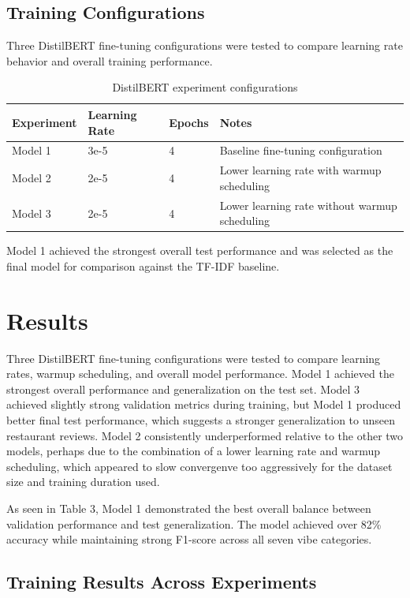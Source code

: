 \documentclass[11pt]{article}
\begin{document}
\subsection{Training Configurations}

Three DistilBERT fine-tuning configurations were tested to compare learning rate behavior and overall training performance.

\begin{table}[h]
\centering
\begin{tabular}{llll}
\toprule
Experiment & Learning Rate & Epochs & Notes \\
\midrule
Model 1 & 3e-5 & 4 & Baseline fine-tuning configuration \\
Model 2 & 2e-5 & 4 & Lower learning rate with warmup scheduling \\
Model 3 & 2e-5 & 4 & Lower learning rate without warmup scheduling \\
\bottomrule
\end{tabular}
\caption{DistilBERT experiment configurations}
\end{table}

Model 1 achieved the strongest overall test performance and was selected as the final model for comparison against the TF-IDF baseline.


\section{Results}

Three DistilBERT fine-tuning configurations were tested to compare learning rates, warmup scheduling, and overall model performance. 
Model 1 achieved the strongest overall performance and generalization on the test set. Model 3 achieved slightly strong validation metrics 
during training, but Model 1 produced better final test performance, which suggests a stronger generalization to unseen restaurant reviews. 
Model 2 consistently underperformed relative to the other two models, perhaps due to the combination of a lower learning rate and warmup 
scheduling, which appeared to slow convergenve too aggressively for the dataset size and training duration used. 

\medbreak \noindent As seen in Table 3, Model 1 demonstrated the best overall balance between validation performance and test generalization. The model achieved 
over 82\% accuracy while maintaining strong F1-score across all seven vibe categories.


\subsection{Training Results Across Experiments}
\end{document}
